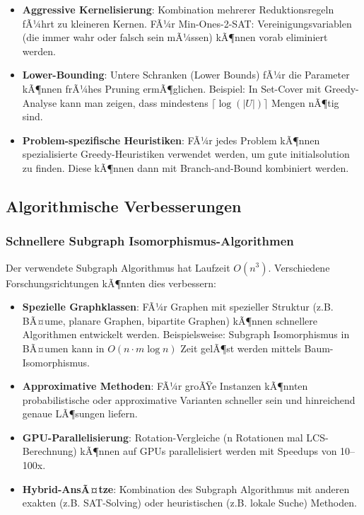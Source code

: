﻿\documentclass[a4paper,12pt]{article}
\theoremstyle{definition}
\begin{document}
\begin{itemize}
	\item \textbf{Aggressive Kernelisierung}: Kombination mehrerer Reduktionsregeln fÃ¼hrt zu kleineren Kernen. FÃ¼r Min-Ones-2-SAT: Vereinigungsvariablen (die immer wahr oder falsch sein mÃ¼ssen) kÃ¶nnen vorab eliminiert werden.
	
	\item \textbf{Lower-Bounding}: Untere Schranken (Lower Bounds) fÃ¼r die Parameter kÃ¶nnen frÃ¼hes Pruning ermÃ¶glichen. Beispiel: In Set-Cover mit Greedy-Analyse kann man zeigen, dass mindestens $\lceil \log(|U|) \rceil$ Mengen nÃ¶tig sind.
	
	\item \textbf{Problem-spezifische Heuristiken}: FÃ¼r jedes Problem kÃ¶nnen spezialisierte Greedy-Heuristiken verwendet werden, um gute initialsolution zu finden. Diese kÃ¶nnen dann mit Branch-and-Bound kombiniert werden.
\end{itemize}

\subsection{Algorithmische Verbesserungen}

\subsubsection{Schnellere Subgraph Isomorphismus-Algorithmen}

Der verwendete Subgraph Algorithmus hat Laufzeit $O(n^3)$. Verschiedene Forschungsrichtungen kÃ¶nnten dies verbessern:

\begin{itemize}
	\item \textbf{Spezielle Graphklassen}: FÃ¼r Graphen mit spezieller Struktur (z.B. BÃ¤ume, planare Graphen, bipartite Graphen) kÃ¶nnen schnellere Algorithmen entwickelt werden. Beispielsweise: Subgraph Isomorphismus in BÃ¤umen kann in $O(n \cdot m \log n)$ Zeit gelÃ¶st werden mittels Baum-Isomorphismus.
	
	\item \textbf{Approximative Methoden}: FÃ¼r groÃŸe Instanzen kÃ¶nnten probabilistische oder approximative Varianten schneller sein und hinreichend genaue LÃ¶sungen liefern.
	
	\item \textbf{GPU-Parallelisierung}: Rotation-Vergleiche (n Rotationen mal LCS-Berechnung) kÃ¶nnen auf GPUs parallelisiert werden mit Speedups von 10--100x.
	
	\item \textbf{Hybrid-AnsÃ¤tze}: Kombination des Subgraph Algorithmus mit anderen exakten (z.B. SAT-Solving) oder heuristischen (z.B. lokale Suche) Methoden.
\end{itemize}
\end{document}
